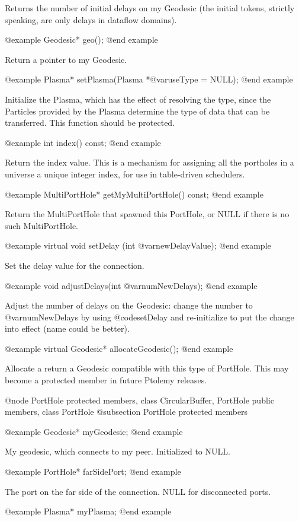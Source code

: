 Returns the number of initial delays on my Geodesic (the initial tokens,
strictly speaking, are only delays in dataflow domains).

@example
Geodesic* geo();
@end example

Return a pointer to my Geodesic.

@example
Plasma* setPlasma(Plasma *@var{useType} = NULL);
@end example

Initialize the Plasma, which has the effect of resolving the type, since
the Particles provided by the Plasma determine the type of data that can
be transferred.  This function should be protected.

@example
int index() const;
@end example

Return the index value.  This is a mechanism for assigning all the
portholes in a universe a unique integer index, for use in table-driven
schedulers.

@example
MultiPortHole* getMyMultiPortHole() const;
@end example

Return the MultiPortHole that spawned this PortHole, or NULL
if there is no such MultiPortHole.

@example
virtual void setDelay (int @var{newDelayValue});
@end example

Set the delay value for the connection.

@example
void adjustDelays(int @var{numNewDelays});
@end example

Adjust the number of delays on the Geodesic: change the number to
@var{numNewDelays} by using @code{setDelay} and re-initialize to
put the change into effect (name could be better).

@example
virtual Geodesic* allocateGeodesic();
@end example

Allocate a return a Geodesic compatible with this type of PortHole.
This may become a protected member in future Ptolemy releases.

@node PortHole protected members, class CircularBuffer, PortHole public members, class PortHole
@subsection PortHole protected members

@example
Geodesic* myGeodesic;
@end example

My geodesic, which connects to my peer.  Initialized to NULL.

@example
PortHole* farSidePort;
@end example

The port on the far side of the connection.  NULL for disconnected ports.

@example
Plasma* myPlasma;
@end example

